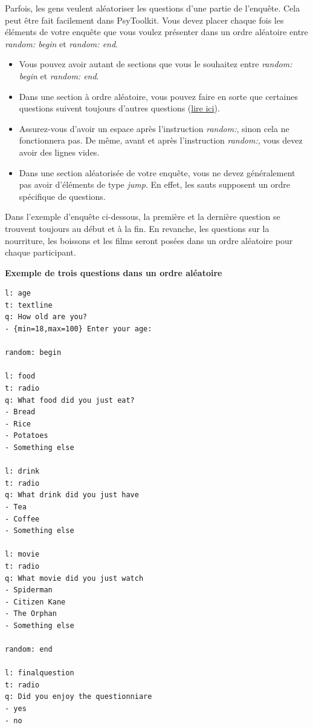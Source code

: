 \documentclass[
]{book}
\providecommand{\tightlist}{%
  \setlength{\itemsep}{0pt}\setlength{\parskip}{0pt}}
\begin{document}
Parfois, les gens veulent aléatoriser les questions d'une partie de l'enquête. Cela peut être fait facilement dans PsyToolkit. Vous devez placer chaque fois les éléments de votre enquête que vous voulez présenter dans un ordre aléatoire entre \emph{random: begin} et \emph{random: end}.

\begin{itemize}
\tightlist
\item
  Vous pouvez avoir autant de sections que vous le souhaitez entre \emph{random: begin} et \emph{random: end}.
\item
  Dans une section à ordre aléatoire, vous pouvez faire en sorte que certaines questions suivent toujours d'autres questions (\href{https://www.psytoolkit.org/doc3.4.0/online-survey-syntax.html\#link}{lire ici}).
\item
  Assurez-vous d'avoir un espace après l'instruction \emph{random:}, sinon cela ne fonctionnera pas. De même, avant et après l'instruction \emph{random:}, vous devez avoir des lignes vides.
\item
  Dans une section aléatorisée de votre enquête, vous ne devez généralement pas avoir d'éléments de type \emph{jump}. En effet, les sauts supposent un ordre spécifique de questions.
\end{itemize}

Dans l'exemple d'enquête ci-dessous, la première et la dernière question se trouvent toujours au début et à la fin. En revanche, les questions sur la nourriture, les boissons et les films seront posées dans un ordre aléatoire pour chaque participant.

\textbf{Exemple de trois questions dans un ordre aléatoire}

\begin{verbatim}
l: age
t: textline
q: How old are you?
- {min=18,max=100} Enter your age:

random: begin

l: food
t: radio
q: What food did you just eat?
- Bread
- Rice
- Potatoes
- Something else

l: drink
t: radio
q: What drink did you just have
- Tea
- Coffee
- Something else

l: movie
t: radio
q: What movie did you just watch
- Spiderman
- Citizen Kane
- The Orphan
- Something else

random: end

l: finalquestion
t: radio
q: Did you enjoy the questionniare
- yes
- no
\end{verbatim}
\end{document}
